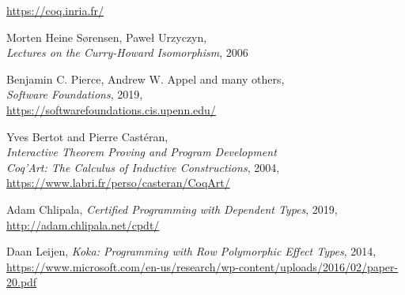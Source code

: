 \documentclass[declaration,inz,english,shortabstract]{iithesis}
\begin{document}
\begin{thebibliography}{1}
        \url{https://coq.inria.fr/}

        Morten Heine Sørensen, Paweł Urzyczyn, \\
        \textit{Lectures on the Curry-Howard Isomorphism}, 2006
    
        Benjamin C. Pierce, Andrew W. Appel and many others, \\
        \textit{Software Foundations}, 2019, \\
        \url{https://softwarefoundations.cis.upenn.edu/}
    
        Yves Bertot and Pierre Castéran, \\
        \textit{Interactive Theorem Proving and Program Development \\ Coq'Art: The Calculus of Inductive Constructions}, 2004, \\
        \url{https://www.labri.fr/perso/casteran/CoqArt/}

        Adam Chlipala,
        \textit{Certified Programming with Dependent Types}, 2019,
        \url{http://adam.chlipala.net/cpdt/}

        Daan Leijen,
        \textit{Koka: Programming with Row Polymorphic Effect Types}, 2014, \\
        \url{https://www.microsoft.com/en-us/research/wp-content/uploads/2016/02/paper-20.pdf}
\end{thebibliography}

\end{document}
